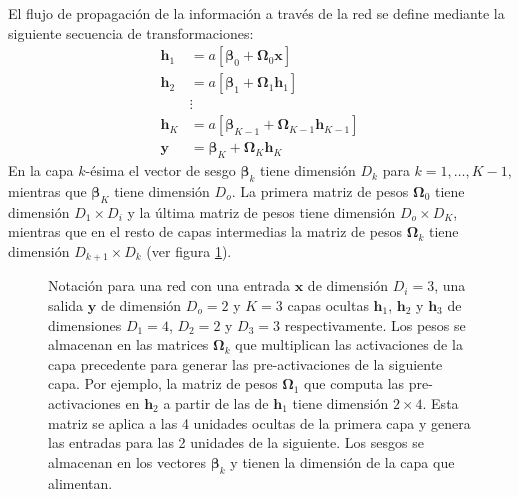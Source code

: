 El flujo de propagación de la información a través de la red se 
define mediante la siguiente secuencia de transformaciones:
$$\begin{aligned}
    \mathbf{h}_1 &= a[\boldsymbol{\beta}_0 + \boldsymbol{\Omega}_0 \mathbf{x}] \\
    \mathbf{h}_2 &= a[\boldsymbol{\beta}_1 + \boldsymbol{\Omega}_1 \mathbf{h}_1] \\
    &\vdots \\
    \mathbf{h}_K &= a[\boldsymbol{\beta}_{K-1} + \boldsymbol{\Omega}_{K-1} \mathbf{h}_{K-1}] \\
    \mathbf{y} &= \boldsymbol{\beta}_K + \boldsymbol{\Omega}_K \mathbf{h}_K
\end{aligned}$$
En la capa $k$-ésima el vector de sesgo $\boldsymbol{\beta}_{k}$ 
tiene dimensión $D_k$ para   \mbox{$k = 1 ,\dots, K-1$,} 
mientras que $\boldsymbol{\beta}_{K}$ tiene dimensión $D_o$. 
La primera matriz de pesos $\boldsymbol{\Omega}_0$ tiene dimensión 
$D_1 \times D_i$ y la última matriz de pesos tiene dimensión $D_o \times D_K$, 
mientras que en el resto de capas intermedias la matriz de pesos 
$\boldsymbol{\Omega}_k$
tiene dimensión $D_{k+1} \times D_k$ (ver figura \ref{fig:red_neuronal}).

\begin{figure}[t]
    \vspace{0.8cm}
    \centering
    \resizebox{\textwidth}{!}{%
    }
    \caption{Notación para una red con una entrada $\mathbf{x}$ de dimensión $D_i = 3$, 
    una salida $\mathbf{y}$ de dimensión $D_o = 2$ y $K =3$ capas 
    ocultas $ \mathbf{h}_1$, $ \mathbf{h}_2$ y $ \mathbf{h}_3$ de 
    dimensiones $D_1 = 4$, $D_2 = 2$ y $D_3 = 3$ respectivamente.
    Los pesos se almacenan en las matrices $\boldsymbol{\Omega}_k$ que multiplican las 
    activaciones de la capa precedente para generar las pre-activaciones de la siguiente 
    capa. Por ejemplo, la matriz de pesos $\boldsymbol{\Omega}_1$ que computa las 
    pre-activaciones en $\mathbf{h}_2$ a partir de las de $\mathbf{h}_1$ tiene 
    dimensión $2 \times 4$. Esta matriz se aplica a las 4 unidades ocultas de la 
    primera capa y genera las entradas para las 2 unidades de la siguiente. 
    Los sesgos se almacenan en los vectores $\boldsymbol{\beta}_{k}$ y tienen la 
    dimensión de la capa que alimentan.}
    \label{fig:red_neuronal}
\end{figure}


